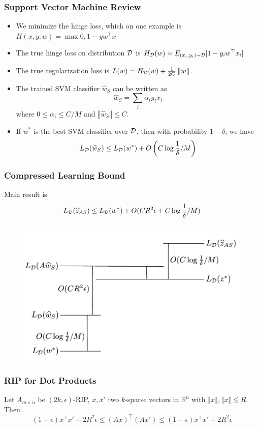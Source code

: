 \documentclass[aspectratio=34]{beamer}
\theoremstyle{plain}
\begin{document}
\begin{frame}
\frametitle{Support Vector Machine Review}
\begin{itemize}
    \item We minimize the hinge loss, which on one example is $H(x,y;w) = \max{0, 1 - yw^\top x}$
    \item The true hinge loss on distribution $\cal D$ is $H_{\cal D}(w) = E_{(x_i,y_i) \sim {\cal D}} [1 - y_i w^\top x_i]$
    \item The true regularization loss is $L(w) = H_{\cal D}(w) + \frac{1}{2C}\left\Vert w \right\Vert$.
    \item The trained SVM classifier $\widehat{w}_S$ can be written as $$\widehat{w}_S = \sum_i \alpha_i y_i x_i $$ where $0 \leq \alpha_i \leq C/M$ and $\left\Vert \widehat{w}_S \right\Vert \leq C$.
    \item If $w^*$ is the best SVM classifier over $\cal D$, then with probability $1 - \delta$, we have \citep{Sridharan08} $$L_{\cal D}(\widehat{w}_S) \leq L_{\cal D}(w^*) + O\left(C \log \frac{1}{\delta} / M\right)$$
\end{itemize}
\end{frame}

\begin{frame}
    \frametitle{Compressed Learning Bound}
    Main result is
    \[
    L_{\cal D}(\widehat{z}_{AS}) \leq L_{\cal D}(w^*) + O(CR^2\epsilon + C\log\frac{1}{\delta} / M)
    \]
    \begin{figure}
        \includegraphics[width=\columnwidth]{bounds_argument_figure.pdf}
    \end{figure}
\end{frame}

\begin{frame}
\frametitle{RIP for Dot Products}
\begin{theorem}
    \label{theorem:kernel} Let $A_{m\times n}$ be $(2k,\epsilon)$-RIP,
    $x,x'$ two $k$-sparse vectors in $\mathbb{R}^{n}$ with $\left\Vert x\right\Vert ,\left\Vert x\right\Vert \leq R$.
    Then
    \[
        (1+\epsilon)x^{\top}x'-2R^{2}\epsilon\leq\left(Ax\right)^{\top}\left(Ax'\right)\leq(1-\epsilon)x^{\top}x'+2R^{2}\epsilon
    \]
\end{theorem}
\end{frame}
\end{document}
